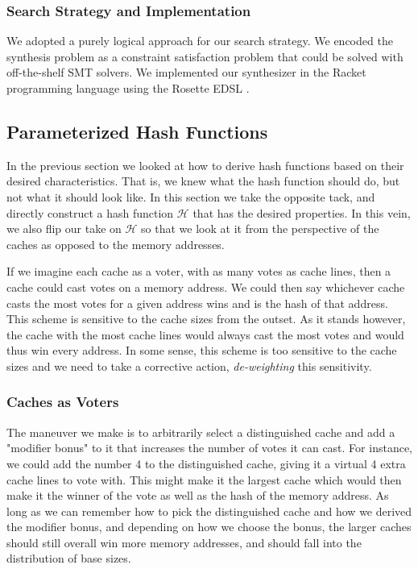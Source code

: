 \subsubsection{Search Strategy and Implementation}

We adopted a purely logical approach for our search strategy. We encoded the
synthesis problem as a constraint satisfaction problem that could be solved with
off-the-shelf SMT solvers. We implemented our synthesizer in the Racket
programming language using the Rosette EDSL \cite{rosette}.


\subsection{Parameterized Hash Functions}

In the previous section we looked at how to derive hash functions based on their
desired characteristics. That is, we knew what the hash function should do, but
not what it should look like. In this section we take the opposite tack, and
directly construct a hash function $\mathcal{H}$ that has the desired
properties. In this vein, we also flip our take on $\mathcal{H}$ so that we look
at it from the perspective of the caches as opposed to the memory addresses.

If we imagine each cache as a voter, with as many votes as cache lines, then a
cache could cast votes on a memory address.  We could then say whichever cache
casts the most votes for a given address wins and is the hash of that
address. This scheme is sensitive to the cache sizes from the outset. As it
stands however, the cache with the most cache lines would always cast the most
votes and would thus win every address.  In some sense, this scheme is too
sensitive to the cache sizes and we need to take a corrective action,
\textit{de-weighting} this sensitivity.

\subsubsection{Caches as Voters}
  
The maneuver we make is to arbitrarily select a distinguished cache and add a
"modifier bonus" to it that increases the number of votes it can cast. For
instance, we could add the number 4 to the distinguished cache, giving it a
virtual 4 extra cache lines to vote with. This might make it the largest cache
which would then make it the winner of the vote as well as the hash of the
memory address.  As long as we can remember how to pick the distinguished cache
and how we derived the modifier bonus, and depending on how we choose the bonus,
the larger caches should still overall win more memory addresses, and should
fall into the distribution of base sizes.

